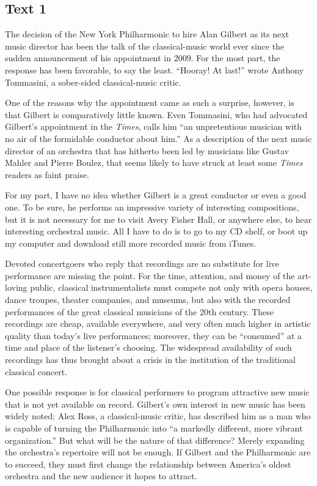 \newpage
\subsection{Text 1}


The decision of the New York Philharmonic to hire Alan Gilbert as its
next music director has been the talk of the classical-music world ever
since the sudden announcement of his appointment in 2009. For the most
part, the response has been favorable, to say the least. ``Hooray! At
last!'' wrote Anthony Tommasini, a sober-sided classical-music critic.

One of the reasons why the appointment came as such a surprise, however,
is that Gilbert is comparatively little known. Even Tommasini, who had
advocated Gilbert's appointment in the \emph{Times}, calls him ``an
unpretentious musician with no air of the formidable conductor about
him.'' As a description of the next music director of an orchestra that
has hitherto been led by musicians like Gustav Mahler and Pierre Boulez,
that seems likely to have struck at least some \emph{Times} readers as
faint praise.

For my part, I have no idea whether Gilbert is a great conductor or even
a good one. To be sure, he performs an impressive variety of interesting
compositions, but it is not necessary for me to visit Avery Fisher Hall,
or anywhere else, to hear interesting orchestral music. All I have to do
is to go to my CD shelf, or boot up my computer and download still more
recorded music from iTunes.

Devoted concertgoers who reply that recordings are no substitute for
live performance are missing the point. For the time, attention, and
money of the art-loving public, classical instrumentalists must compete
not only with opera houses, dance troupes, theater companies, and
museums, but also with the recorded performances of the great classical
musicians of the 20th century. These recordings are
cheap, available everywhere, and very often much higher in artistic
quality than today's live performances; moreover, they can be
``consumed'' at a time and place of the listener's choosing. The
widespread availability of such recordings has thus brought about a
crisis in the institution of the traditional classical concert.

One possible response is for classical performers to program attractive
new music that is not yet available on record. Gilbert's own interest in
new music has been widely noted: Alex Ross, a classical-music critic,
has described him as a man who is capable of turning the Philharmonic
into ``a markedly different, more vibrant organization.'' But what will
be the nature of that difference? Merely expanding the orchestra's
repertoire will not be enough. If Gilbert and the Philharmonic are to
succeed, they must first change the relationship between America's
oldest orchestra and the new audience it hopes to attract.


